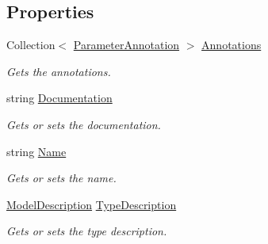 \subsection*{Properties}
\begin{DoxyCompactItemize}
\item 
Collection$<$ \hyperlink{class_open_1_1_g_i_1_1hypermart_1_1_areas_1_1_help_page_1_1_model_descriptions_1_1_parameter_annotation}{Parameter\+Annotation} $>$ \hyperlink{class_open_1_1_g_i_1_1hypermart_1_1_areas_1_1_help_page_1_1_model_descriptions_1_1_parameter_description_ab64b50d81b22dc90c5d40081722ff711}{Annotations}
\begin{DoxyCompactList}\small\item\em Gets the annotations. \end{DoxyCompactList}\item 
string \hyperlink{class_open_1_1_g_i_1_1hypermart_1_1_areas_1_1_help_page_1_1_model_descriptions_1_1_parameter_description_a14b38b56f23972d23b7fc5594b5ac15f}{Documentation}
\begin{DoxyCompactList}\small\item\em Gets or sets the documentation. \end{DoxyCompactList}\item 
string \hyperlink{class_open_1_1_g_i_1_1hypermart_1_1_areas_1_1_help_page_1_1_model_descriptions_1_1_parameter_description_a213cc3debc198eb331e57e38ecdca4ed}{Name}
\begin{DoxyCompactList}\small\item\em Gets or sets the name. \end{DoxyCompactList}\item 
\hyperlink{class_open_1_1_g_i_1_1hypermart_1_1_areas_1_1_help_page_1_1_model_descriptions_1_1_model_description}{Model\+Description} \hyperlink{class_open_1_1_g_i_1_1hypermart_1_1_areas_1_1_help_page_1_1_model_descriptions_1_1_parameter_description_a175a097aa553ad65ae87f136df0e24e7}{Type\+Description}
\begin{DoxyCompactList}\small\item\em Gets or sets the type description. \end{DoxyCompactList}\end{DoxyCompactItemize}



